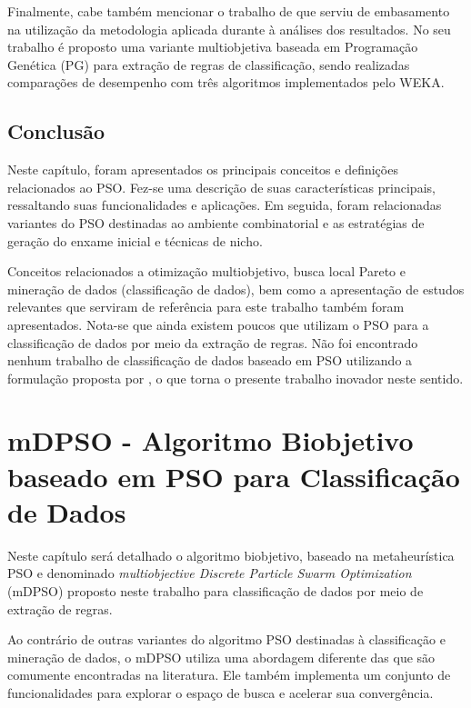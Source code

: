 \documentclass[
	12pt,				%
	openany,			%
	oneside,	
	a4paper,			%
	brazil,				%
	]{unimontes-ppgmsc-abntex2}
\begin{document}
Finalmente, cabe também mencionar o trabalho de  que serviu de embasamento na utilização da metodologia aplicada durante à análises dos resultados. No seu trabalho é proposto uma variante multiobjetiva baseada em Programação Genética (PG) para extração de regras de classificação, sendo realizadas comparações de desempenho com três algoritmos implementados pelo WEKA.

\section{Conclusão}

Neste capítulo, foram apresentados os principais conceitos e definições relacionados ao PSO. Fez-se uma descrição de suas características principais, ressaltando suas funcionalidades e aplicações. Em seguida, foram relacionadas variantes do PSO destinadas ao ambiente combinatorial e as estratégias de geração do enxame inicial e técnicas de nicho.

Conceitos relacionados a otimização multiobjetivo, busca local Pareto e mineração de dados (classificação de dados), bem como a apresentação de estudos relevantes que serviram de referência para este trabalho também foram apresentados. Nota-se que ainda existem poucos que utilizam o PSO para a classificação de dados por meio da extração de regras. Não foi encontrado nenhum trabalho de classificação de dados baseado em PSO utilizando a formulação proposta por , o que torna o presente trabalho inovador neste sentido.


\chapter{mDPSO - Algoritmo Biobjetivo baseado em PSO para Classificação de Dados}
\label{ch:mdpso}

Neste capítulo será detalhado o algoritmo biobjetivo, baseado na metaheurística PSO e denominado {\em multiobjective Discrete Particle Swarm Optimization} (mDPSO) proposto neste trabalho para classificação de dados por meio de extração de regras. 

Ao contrário de outras variantes do algoritmo PSO destinadas à classificação e mineração de dados, o mDPSO utiliza uma abordagem diferente das que são comumente encontradas na literatura. Ele também implementa um conjunto de funcionalidades para explorar o espaço de busca e acelerar sua convergência.
\end{document}
